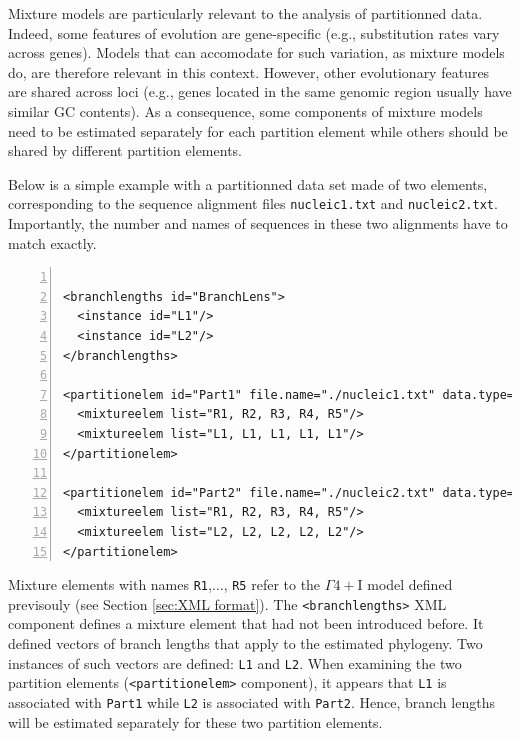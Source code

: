 \documentclass[a4paper,12pt]{article}
\newcommand{\x}[1]{\texttt{#1}}
\begin{document}
Mixture models are particularly relevant to the analysis of partitionned data. Indeed, some features
of  evolution are  gene-specific (e.g.,  substitution  rates vary  across genes).   Models that  can
accomodate  for such  variation,  as mixture  models do,  are  therefore relevant  in this  context.
However, other evolutionary features are shared across loci (e.g., genes located in the same genomic
region usually have similar  GC contents). As a consequence, some components  of mixture models need
to be  estimated separately for each  partition element while  others should be shared  by different
partition elements.

Below is a simple example with a partitionned data set made of two elements, corresponding to the
sequence alignment files \x{nucleic1.txt} and \x{nucleic2.txt}. Importantly, the number and names of
sequences in these two alignments have to match exactly. 

\vspace{0.2cm}
\begin{Verbatim}[frame=single, label=Two sets of branch lengths (one per partition element),
  samepage=true, baselinestretch=0.5, fontsize=\small, numbers=left]

<branchlengths id="BranchLens">
  <instance id="L1"/>
  <instance id="L2"/>
</branchlengths>

<partitionelem id="Part1" file.name="./nucleic1.txt" data.type="nt">
  <mixtureelem list="R1, R2, R3, R4, R5"/>
  <mixtureelem list="L1, L1, L1, L1, L1"/>
</partitionelem>

<partitionelem id="Part2" file.name="./nucleic2.txt" data.type="nt">
  <mixtureelem list="R1, R2, R3, R4, R5"/>
  <mixtureelem list="L2, L2, L2, L2, L2"/>
</partitionelem>

\end{Verbatim}

Mixture elements with names  \x{R1},$\ldots$, \x{R5} refer to the $\Gamma4+$I model defined
previsouly  (see Section  \ref{sec:XML format}).   The \x{<branchlengths>}  XML component  defines a
mixture element  that had not  been introduced  before.  It defined  vectors of branch  lengths that
apply to the estimated phylogeny. Two instances of  such vectors are defined: \x{L1} and \x{L2}.
When examining the  two partition elements (\x{<partitionelem>} component), it  appears that \x{L1}
is associated with \x{Part1} while \x{L2} is associated with \x{Part2}.  Hence, branch lengths
will be estimated separately for these two partition elements.
\end{document}
